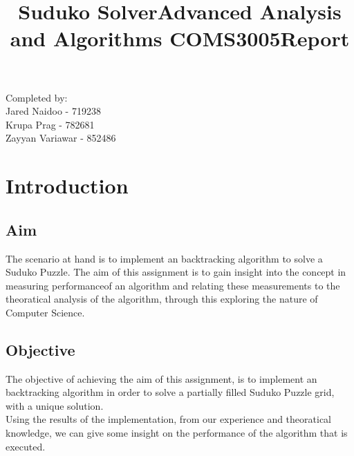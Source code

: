 \documentclass[12pt]{article}
\begin{document}
\title{\textbf{Suduko Solver}}
\maketitle

\begin{center}
\title{\textbf{Advanced Analysis and Algorithms COMS3005}}
\maketitle 
\end{center}
\begin{center}
\title{\textbf{Report}}
\maketitle 
\end{center}

\begin{center}
Completed by:\\
Jared Naidoo - 719238
\\Krupa Prag - 782681
\\Zayyan Variawar - 852486
\end{center}

\newpage

\tableofcontents

\newpage

\section{Introduction}
\subsection{Aim}
\begin{flushleft}
The scenario at hand is to implement an backtracking algorithm to solve a Suduko Puzzle. The aim of this assignment is to gain insight into the concept in measuring performanceof an algorithm and relating these  measurements to the theoratical analysis of the algorithm, through this exploring the nature of Computer Science. 
\end{flushleft}
\subsection{Objective}
\begin{flushleft}
The objective of achieving the aim of this assignment, is to implement an backtracking algorithm in order to solve a partially filled Suduko Puzzle grid, with a unique solution. \\
Using the results of the implementation, from our experience and theoratical knowledge, we can give some insight on the performance of the algorithm that is executed. 
\end{flushleft}	
\end{document}
